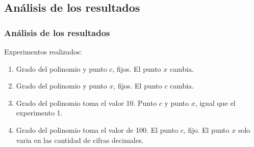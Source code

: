 \documentclass{beamer}
\begin{document}
\subsection{Análisis de los resultados}

\begin{frame}
\frametitle{Análisis de los resultados}

\begin{block}{Experimentos realizados:}
  \begin{enumerate}
    \item
     Grado del polinomio y punto $c$, fijos. El punto $x$ cambia. 
      \pause
     
    \item
    Grado del polinomio y punto $x$, fijos. El punto $c$ cambia.
      \pause

    \item
    Grado del polinomio toma el valor 10. Punto $c$ y punto $x$, igual que el experimento 1. 
      \pause
    
    \item
   Grado del polinomio toma el valor de 100. El punto $c$, fijo. El punto $x$ solo varia en las cantidad de cifras decimales. 

  \end{enumerate}
\end{block}

\end{frame}
\end{document}
